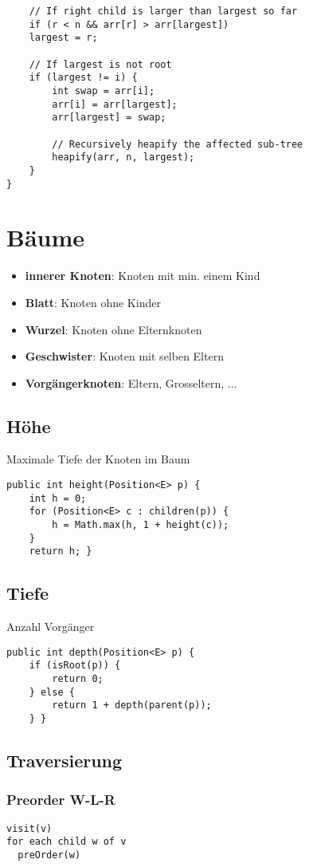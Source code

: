 \begin{multicols*}{4}
\begin{lstlisting}
	// If right child is larger than largest so far 
	if (r < n && arr[r] > arr[largest]) 
	largest = r; 
	
	// If largest is not root 
	if (largest != i) { 
		int swap = arr[i]; 
		arr[i] = arr[largest]; 
		arr[largest] = swap; 
		
		// Recursively heapify the affected sub-tree 
		heapify(arr, n, largest); 
	} 
} 
			\end{lstlisting}

		
		
\section{Bäume}
	\begin{itemize}
		\item \textbf{innerer Knoten}: Knoten mit min. einem Kind
		\item \textbf{Blatt}: Knoten ohne Kinder
		\item \textbf{Wurzel}: Knoten ohne Elternknoten
		\item \textbf{Geschwister}: Knoten mit selben Eltern
		\item \textbf{Vorgängerknoten}: Eltern, Grosseltern, ...
	\end{itemize}

	\subsection{Höhe}
	Maximale Tiefe der Knoten im Baum
		\begin{lstlisting}
public int height(Position<E> p) {
	int h = 0;
	for (Position<E> c : children(p)) {
		h = Math.max(h, 1 + height(c));
	}
	return h; }
		\end{lstlisting}
	
	\subsection{Tiefe}
	Anzahl Vorgänger
		\begin{lstlisting}
public int depth(Position<E> p) {
	if (isRoot(p)) {
		return 0;
	} else {
		return 1 + depth(parent(p));
	} }
		\end{lstlisting}
	\subsection{Traversierung}
		\subsubsection{Preorder W-L-R}
			\begin{lstlisting}
visit(v)
for each child w of v
  preOrder(w)
			\end{lstlisting}
		

\end{multicols*}
